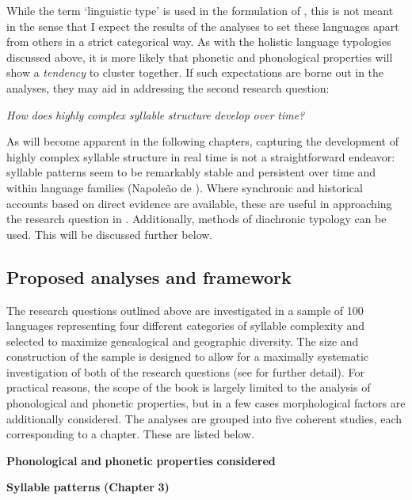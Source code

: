   While the term ‘linguistic type’ is used in the formulation of , this is not meant in the sense that I expect the results of the analyses to set these languages apart from others in a strict categorical way. As with the holistic language typologies discussed above, it is more likely that phonetic and phonological properties will show a \textit{tendency} to cluster together. If such expectations are borne out in the analyses, they may aid in addressing the second research question:

\ea\label{ex:(1.24)}
   \textit{How} \textit{does} \textit{highly} \textit{complex} \textit{syllable} \textit{structure} \textit{develop} \textit{over} \textit{time?}
\z

  As will become apparent in the following chapters, capturing the development of highly complex syllable structure in real time is not a straightforward endeavor: syllable patterns seem to be remarkably stable and persistent over time and within language families (Napoleão de \citealt{Souza2017}). Where synchronic and historical accounts based on direct evidence are available, these are useful in approaching the research question in . Additionally, methods of diachronic typology can be used. This will be discussed further below.

\subsection{Proposed analyses and framework}\label{sec:1.4.2}

  The research questions outlined above are investigated in a sample of 100 languages representing four different categories of syllable complexity and selected to maximize genealogical and geographic diversity. The size and construction of the sample is designed to allow for a maximally systematic investigation of both of the research questions (see  for further detail). For practical reasons, the scope of the book is largely limited to the analysis of phonological and phonetic properties, but in a few cases morphological factors are additionally considered. The analyses are grouped into five coherent studies, each corresponding to a chapter. These are listed below.

\ea\label{ex:(1.25)}
  \textbf{Phonological} \textbf{and} \textbf{phonetic} \textbf{properties} \textbf{considered}

\textbf{Syllable} \textbf{patterns} \textbf{(Chapter} \textbf{3)}

